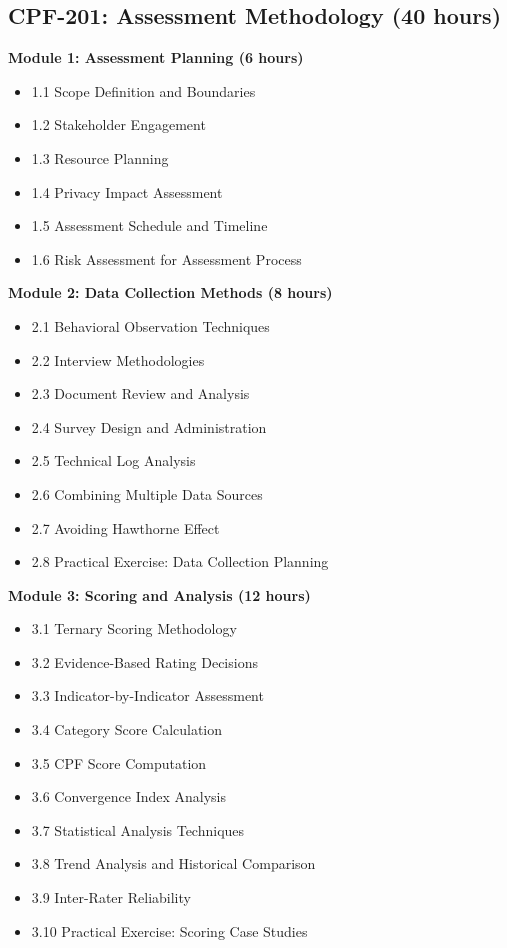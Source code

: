 \documentclass[11pt,a4paper]{article}
\begin{document}
\subsection{CPF-201: Assessment Methodology (40 hours)}

\textbf{Module 1: Assessment Planning (6 hours)}
\begin{itemize}
\item 1.1 Scope Definition and Boundaries
\item 1.2 Stakeholder Engagement
\item 1.3 Resource Planning
\item 1.4 Privacy Impact Assessment
\item 1.5 Assessment Schedule and Timeline
\item 1.6 Risk Assessment for Assessment Process
\end{itemize}

\textbf{Module 2: Data Collection Methods (8 hours)}
\begin{itemize}
\item 2.1 Behavioral Observation Techniques
\item 2.2 Interview Methodologies
\item 2.3 Document Review and Analysis
\item 2.4 Survey Design and Administration
\item 2.5 Technical Log Analysis
\item 2.6 Combining Multiple Data Sources
\item 2.7 Avoiding Hawthorne Effect
\item 2.8 Practical Exercise: Data Collection Planning
\end{itemize}

\textbf{Module 3: Scoring and Analysis (12 hours)}
\begin{itemize}
\item 3.1 Ternary Scoring Methodology
\item 3.2 Evidence-Based Rating Decisions
\item 3.3 Indicator-by-Indicator Assessment
\item 3.4 Category Score Calculation
\item 3.5 CPF Score Computation
\item 3.6 Convergence Index Analysis
\item 3.7 Statistical Analysis Techniques
\item 3.8 Trend Analysis and Historical Comparison
\item 3.9 Inter-Rater Reliability
\item 3.10 Practical Exercise: Scoring Case Studies
\end{itemize}
\end{document}
